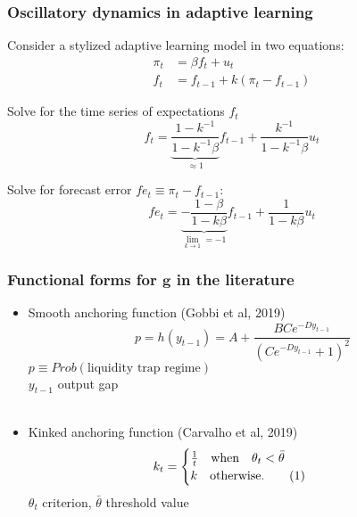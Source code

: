\documentclass[10pt]{beamer}
\newcommand\numberthis{\addtocounter{equation}{1}\tag{\theequation}} %
\begin{document}
\begin{frame}[plain]  %
\frametitle{Oscillatory dynamics in adaptive learning}
	\label{oscillatory}

Consider a stylized adaptive learning model in two equations:
\begin{align}
\pi_t & = \beta f_t + u_t  \\
f_t & = f_{t-1} + k(\pi_t - f_{t-1}) 
\end{align}

Solve for the time series of expectations $f_t$
\begin{equation}
f_t = \underbrace{\frac{1-k^{-1}}{1-k^{-1}\beta}}_{\approx 1}f_{t-1} + \frac{k^{-1}}{1-k^{-1}\beta}u_t
\end{equation}

Solve for forecast error $fe_t \equiv \pi_t - f_{t-1}$:
\begin{equation}
fe_t = \underbrace{-\frac{1-\beta}{1-k\beta}}_{\lim_{k \to 1} = -1}f_{t-1} + \frac{1}{1-k\beta}u_t 
\end{equation}

\end{frame}


\begin{frame}[plain]  %
	\frametitle{Functional forms for $\mathbf{g}$ in the literature}
	\label{g}
\begin{itemize}
\item Smooth anchoring function (Gobbi et al, 2019)
\begin{equation}
 p = h(y_{t-1}) = A + \frac{B C e^{-D y_{t-1}}}{( C e^{-D y_{t-1}}+1)^2}
\end{equation}
$p \equiv Prob(\text{liquidity trap regime}) $ \\
$y_{t-1}$ output gap \\


\

\item Kinked anchoring function (Carvalho et al, 2019)
 \begin{align*}
k_t & = \begin{cases} \frac{1}{t} \quad \text{when} \quad \theta_t < \bar{\theta}  \\ k \quad \text{otherwise.}\numberthis
\end{cases} 
\end{align*}
$\theta_t$ criterion, $\bar{\theta}$ threshold value

\end{itemize}

\vfill 
\hyperlink{anchoring1}{}	

\end{frame}
\end{document}

